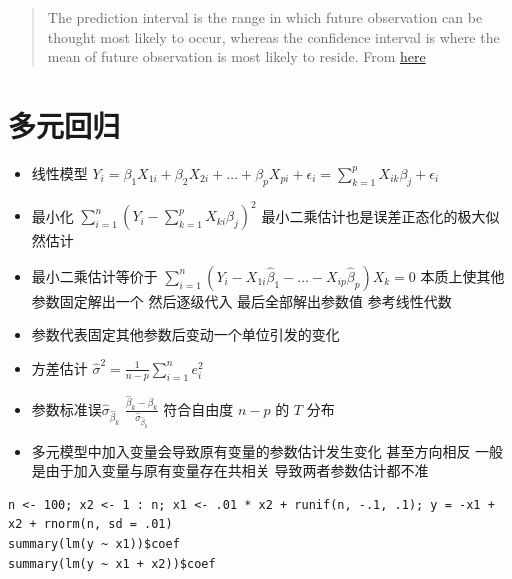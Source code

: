 \documentclass[
]{book}
\providecommand{\tightlist}{%
  \setlength{\itemsep}{0pt}\setlength{\parskip}{0pt}}
\begin{document}
\begin{quote}
The prediction interval is the range in which future observation can be thought most likely to occur, whereas the confidence interval is where the mean of future observation is most likely to reside. From \href{http://stackoverflow.com/questions/9406139/r-programming-predict-prediction-vs-confidence/9406534\#9406534}{here}
\end{quote}

\hypertarget{ux591aux5143ux56deux5f52}{%
\section{多元回归}\label{ux591aux5143ux56deux5f52}}

\begin{itemize}
\tightlist
\item
  线性模型 \(Y_i = \beta_1 X_{1i} + \beta_2 X_{2i} + \ldots + \beta_{p} X_{pi} + \epsilon_{i} = \sum_{k=1}^p X_{ik} \beta_j + \epsilon_{i}\)
\item
  最小化 \(\sum_{i=1}^n \left(Y_i - \sum_{k=1}^p X_{ki} \beta_j\right)^2\) 最小二乘估计也是误差正态化的极大似然估计
\item
  最小二乘估计等价于 \(\sum_{i=1}^n (Y_i - X_{1i}\hat \beta_1 - \ldots - X_{ip}\hat \beta_p) X_k = 0\) 本质上使其他参数固定解出一个 然后逐级代入 最后全部解出参数值 参考线性代数
\item
  参数代表固定其他参数后变动一个单位引发的变化
\item
  方差估计 \(\hat \sigma^2 = \frac{1}{n-p} \sum_{i=1}^n e_i ^2\)
\item
  参数标准误\(\hat \sigma_{\hat \beta_k}\) \(\frac{\hat \beta_k - \beta_k}{\hat \sigma_{\hat \beta_k}}\) 符合自由度 \(n-p\) 的 \(T\) 分布
\item
  多元模型中加入变量会导致原有变量的参数估计发生变化 甚至方向相反 一般是由于加入变量与原有变量存在共相关 导致两者参数估计都不准
\end{itemize}

\begin{verbatim}
n <- 100; x2 <- 1 : n; x1 <- .01 * x2 + runif(n, -.1, .1); y = -x1 + x2 + rnorm(n, sd = .01)
summary(lm(y ~ x1))$coef
summary(lm(y ~ x1 + x2))$coef
\end{verbatim}
\end{document}

